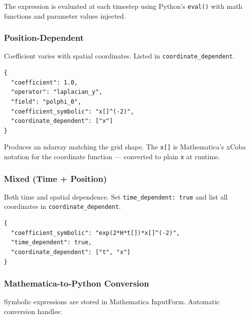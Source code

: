 The expression is evaluated at each timestep using Python's \texttt{eval()} with math functions and parameter values injected.

\subsubsection{Position-Dependent}
\label{sec:json-coeff-position-dependent}

Coefficient varies with spatial coordinates. Listed in \texttt{coordinate\_dependent}.

\begin{lstlisting}[style=json]
{
  "coefficient": 1.0,
  "operator": "laplacian_y",
  "field": "polphi_0",
  "coefficient_symbolic": "x[]^(-2)",
  "coordinate_dependent": ["x"]
}
\end{lstlisting}

Produces an ndarray matching the grid shape. The \texttt{x[]} is Mathematica's xCoba notation for the coordinate function --- converted to plain \texttt{x} at runtime.

\subsubsection{Mixed (Time + Position)}
\label{sec:json-coeff-mixed}

Both time and spatial dependence. Set \texttt{time\_dependent: true} and list all coordinates in \texttt{coordinate\_dependent}.

\begin{lstlisting}[style=json]
{
  "coefficient_symbolic": "exp(2*H*t[])*x[]^(-2)",
  "time_dependent": true,
  "coordinate_dependent": ["t", "x"]
}
\end{lstlisting}

\subsubsection{Mathematica-to-Python Conversion}
\label{sec:json-mma-python}

Symbolic expressions are stored in Mathematica InputForm. Automatic conversion handles:

